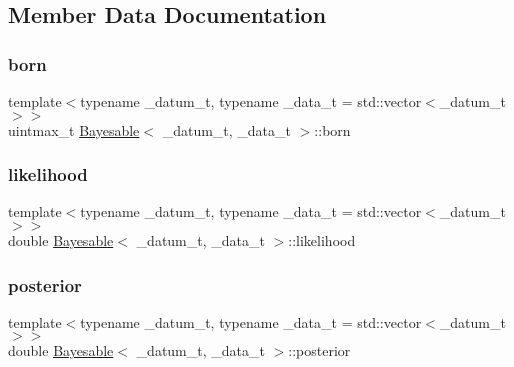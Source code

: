 \subsection{Member Data Documentation}
\mbox{\label{class_bayesable_a898e03a20e1851c868b77ef4e844f0bf}} 
\subsubsection{\texorpdfstring{born}{born}}
{\footnotesize\ttfamily template$<$typename \+\_\+datum\+\_\+t, typename \+\_\+data\+\_\+t = std\+::vector$<$\+\_\+datum\+\_\+t$>$$>$ \\
uintmax\+\_\+t \hyperlink{class_bayesable}{Bayesable}$<$ \+\_\+datum\+\_\+t, \+\_\+data\+\_\+t $>$\+::born}

\mbox{\label{class_bayesable_a4d1a9ed826013bf079cea1867b6d4183}} 
\subsubsection{\texorpdfstring{likelihood}{likelihood}}
{\footnotesize\ttfamily template$<$typename \+\_\+datum\+\_\+t, typename \+\_\+data\+\_\+t = std\+::vector$<$\+\_\+datum\+\_\+t$>$$>$ \\
double \hyperlink{class_bayesable}{Bayesable}$<$ \+\_\+datum\+\_\+t, \+\_\+data\+\_\+t $>$\+::likelihood}

\mbox{\label{class_bayesable_a268442b9aae5b763c17ca29c39231915}} 
\subsubsection{\texorpdfstring{posterior}{posterior}}
{\footnotesize\ttfamily template$<$typename \+\_\+datum\+\_\+t, typename \+\_\+data\+\_\+t = std\+::vector$<$\+\_\+datum\+\_\+t$>$$>$ \\
double \hyperlink{class_bayesable}{Bayesable}$<$ \+\_\+datum\+\_\+t, \+\_\+data\+\_\+t $>$\+::posterior}

\mbox{\label{class_bayesable_a473790922c2dd73e227350d029d73003}} 
